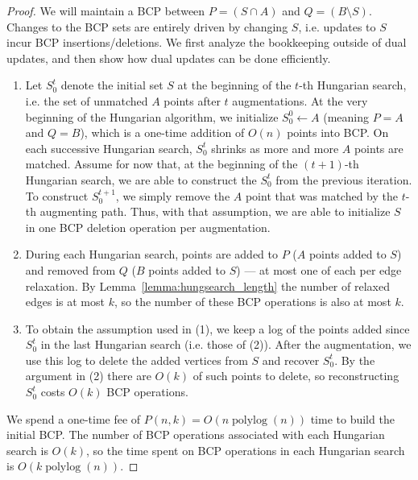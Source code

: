 \documentclass[11pt]{article}
\def\polylog{\mathop{\mathrm{polylog}}}
\theoremstyle{plain}
\begin{document}
\begin{proof}
We will maintain a BCP between $P = (S \cap A)$ and $Q = (B \setminus S)$.
Changes to the BCP sets are entirely driven by changing $S$, i.e. updates to
$S$ incur BCP insertions/deletions.
We first analyze the bookkeeping outside of dual updates, and then show how
dual updates can be done efficiently.

\begin{enumerate}
\item Let $S^t_0$ denote the initial set $S$ at the beginning of the
	$t$-th Hungarian search, i.e. the set of unmatched $A$ points
	after $t$ augmentations.
	At the very beginning of the Hungarian algorithm, we initialize
	$S^0_0 \gets A$ (meaning $P = A$ and $Q = B$), which is a
	one-time addition of $O(n)$ points into BCP.
	On each successive Hungarian search, $S^t_0$ shrinks as more
	and more $A$ points are matched.
	Assume for now that, at the beginning of the $(t+1)$-th
	Hungarian search, we are able to construct the $S^t_0$ from the
	previous iteration.
	To construct $S^{t+1}_0$, we simply remove the $A$ point that
	was matched by the $t$-th augmenting path.
	Thus, with that assumption, we are able to initialize $S$ in
	one BCP deletion operation per augmentation.

\item During each Hungarian search, points are added to $P$ ($A$ points
	added to $S$) and removed from $Q$ ($B$ points added to $S$)
	--- at most one of each per edge relaxation.
	By Lemma~\ref{lemma:hungsearch_length} the number of relaxed
	edges is at most $k$, so the number of these BCP operations is
	also at most $k$.

\item To obtain the assumption used in (1), we keep a log of the
	points added since $S^t_0$ in the last Hungarian search
	(i.e. those of (2)).
	After the augmentation, we use this log to delete the added
	vertices from $S$ and recover $S^t_0$.
	By the argument in (2) there are $O(k)$ of such points to
	delete, so reconstructing $S^t_0$ costs $O(k)$ BCP operations.
\end{enumerate}

We spend a one-time fee of $P(n, k) = O(n \polylog(n))$ time to build the
initial BCP.
The number of BCP operations associated with each Hungarian search is $O(k)$,
so the time spent on BCP operations in each Hungarian search is
$O(k \polylog(n))$.


\end{proof}
\end{document}
